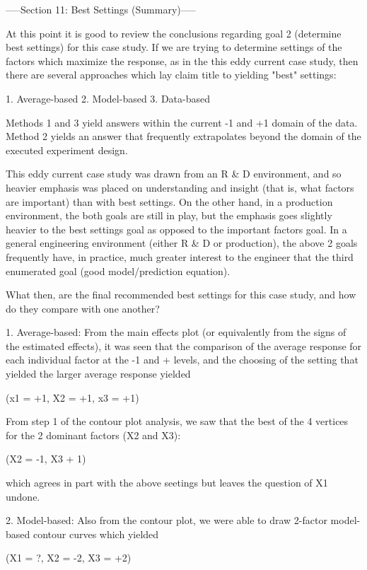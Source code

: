 -----Section 11: Best Settings (Summary)-----

At this point it is good to review the conclusions
regarding goal 2 (determine best settings) for
this case study.  If we are trying to determine
settings of the factors which maximize the
response, as in the this eddy current case study,
then there are several approaches which lay claim
title to yielding "best" settings:

   1. Average-based
   2. Model-based
   3. Data-based

Methods 1 and 3 yield answers within the current
-1 and +1 domain of the data.  Method 2 yields an
answer that frequently extrapolates beyond the
domain of the executed experiment design.

This eddy current case study was drawn from an R & D
environment, and so heavier emphasis was placed on
understanding and insight (that is, what factors
are important) than with best settings.  On the
other hand, in a production environment, the both
goals are still in play, but the emphasis goes
slightly heavier to the best settings goal as
opposed to the important factors goal.  In a
general engineering environment (either R & D or
production), the above 2 goals frequently have, in
practice, much greater interest to the engineer
that the third enumerated goal (good
model/prediction equation).

What then, are the final recommended best settings
for this case study, and how do they compare with
one another?

1. Average-based:
   From the main effects plot (or equivalently
   from the signs of the estimated effects), it
   was seen that the comparison of the average
   response for each individual factor at the -1
   and + levels, and the choosing of the setting
   that yielded the larger average response
   yielded

      (x1 = +1, X2 = +1, x3 = +1)

   From step 1 of the contour plot analysis, we
   saw that the best of the 4 vertices for the 2
   dominant factors (X2 and X3):

      (X2 = -1, X3 + 1)

   which agrees in part with the above seetings
   but leaves the question of X1 undone.

2. Model-based:
   Also from the contour plot, we were able to
   draw 2-factor model-based contour curves which
   yielded

      (X1 = ?, X2 = -2, X3 = +2)


